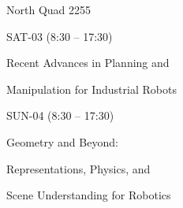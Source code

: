 \documentclass{article}
\begin{document}
\rssheader[2in]

\rssbig
\begin{center}
North Quad 2255
\end{center}

\vfill

\rssmed
\begin{center}
SAT-03 (8:30 -- 17:30)
\end{center}

\rsssm
\begin{center}
Recent Advances in Planning and \par \noindent Manipulation for Industrial Robots
\end{center}

\vfill

\rssmed
\begin{center}
SUN-04 (8:30 -- 17:30)
\end{center}

\rsssm
\begin{center}
Geometry and Beyond: \par \noindent Representations, Physics, and \par \noindent Scene Understanding for Robotics
\end{center}

\vfill
\end{document}
